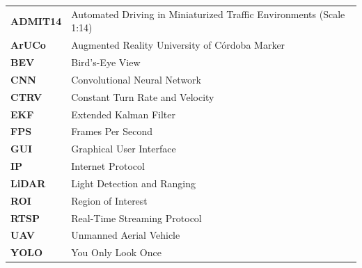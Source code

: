 \documentclass[
11pt, %
english, %
singlespacing, %
liststotoc, %
parskip, %
nohyperref, %
consistentlayout, %
]{PSIThesis} %
\let\cleardoublepage\clearpage
\begin{document}
\begin{tabular}{@{}p{3cm}l@{}}
	\textbf{ADMIT14} & Automated Driving in Miniaturized Traffic Environments (Scale 1:14) \\
	\textbf{ArUCo}   & Augmented Reality University of Córdoba Marker \\
	\textbf{BEV}     & Bird's-Eye View \\
	\textbf{CNN}     & Convolutional Neural Network \\
	\textbf{CTRV}    & Constant Turn Rate and Velocity \\
	\textbf{EKF}     & Extended Kalman Filter \\
	\textbf{FPS}     & Frames Per Second \\
	\textbf{GUI}     & Graphical User Interface \\
	\textbf{IP}      & Internet Protocol \\
	\textbf{LiDAR}   & Light Detection and Ranging \\
	\textbf{ROI}     & Region of Interest \\
	\textbf{RTSP}    & Real-Time Streaming Protocol \\
	\textbf{UAV}     & Unmanned Aerial Vehicle \\
	\textbf{YOLO}    & You Only Look Once \\
\end{tabular}

\cleardoublepage
\restoregeometry



\mainmatter %
\pagestyle{thesis} %

\newcommand{\keyword}[1]{\textbf{#1}}
\newcommand{\tabhead}[1]{\textbf{#1}}
\newcommand{\code}[1]{\texttt{#1}}
\newcommand{\file}[1]{\texttt{#1}}
\newcommand{\option}[1]{\texttt{\itshape#1}}

\graphicspath{{./figures/}{./examples/}}
\end{document}
